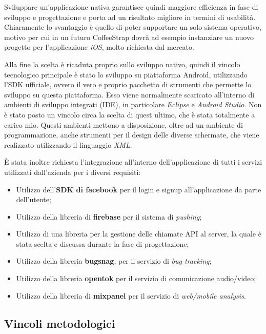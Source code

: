 Sviluppare un'applicazione nativa garantisce quindi maggiore efficienza in fase di sviluppo e progettazione e porta ad un risultato migliore in termini di usabilità. Chiaramente lo svantaggio è quello di poter supportare un solo sistema operativo, motivo per cui in un futuro CoffeeStrap dovrà ad esempio instanziare un nuovo progetto per l'applicazione \textit{iOS}, molto richiesta dal mercato.

Alla fine la scelta è ricaduta proprio sullo sviluppo nativo, quindi il vincolo tecnologico principale è stato lo sviluppo su piattaforma Android, utilizzando l'SDK ufficiale, ovvero il vero e proprio pacchetto di strumenti che permette lo sviluppo su questa piattaforma. Esso viene normalmente scaricato all'interno di ambienti di sviluppo integrati (IDE), in particolare \textit{Eclipse} e \textit{Android Studio}. Non è stato posto un vincolo circa la scelta di quest ultimo, che è stata totalmente a carico mio. Questi ambienti mettono a disposizione, oltre ad un ambiente di programmazione, anche strumenti per il design delle diverse schermate, che viene realizzato utilizzando il linguaggio \textit{XML}. 

È stata inoltre richiesta l'integrazione all'interno dell'applicazione di tutti i servizi utilizzati dall'azienda per i diversi requisiti:

\begin{itemize}

\item Utilizzo dell'\textbf{SDK di facebook} per il login e signup all'applicazione da parte dell'utente;
\item Utilizzo della libreria di \textbf{firebase} per il sistema di \textit{pushing};
\item Utilizzo di una libreria per la gestione delle chiamate API al server, la quale è stata scelta e discussa durante la fase di progettazione;
\item Utilizzo della libreria \textbf{bugsnag}, per il servizio di \textit{bug tracking};
\item Utilizzo della libreria \textbf{opentok} per il servizio di comunicazione audio/video;
\item Utilizzo della libreria di \textbf{mixpanel} per il servizio di \textit{web/mobile analysis}.

\end{itemize} 

\subsection{Vincoli metodologici}

